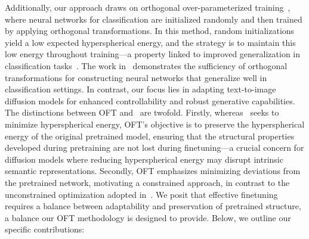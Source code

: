 Additionally, our approach draws on orthogonal over-parameterized training~\cite{liu2021orthogonal}, where neural networks for classification are initialized randomly and then trained by applying orthogonal transformations. In this method, random initializations yield a low expected hyperspherical energy, and the strategy is to maintain this low energy throughout training—a property linked to improved generalization in classification tasks~\cite{liu2018learning,lin2020regularizing}. The work in~\cite{liu2021orthogonal} demonstrates the sufficiency of orthogonal transformations for constructing neural networks that generalize well in classification settings. In contrast, our focus lies in adapting text-to-image diffusion models for enhanced controllability and robust generative capabilities. The distinctions between OFT and~\cite{liu2021orthogonal} are twofold. Firstly, whereas~\cite{liu2021orthogonal} seeks to minimize hyperspherical energy, OFT’s objective is to preserve the hyperspherical energy of the original pretrained model, ensuring that the structural properties developed during pretraining are not lost during finetuning—a crucial concern for diffusion models where reducing hyperspherical energy may disrupt intrinsic semantic representations. Secondly, OFT emphasizes minimizing deviations from the pretrained network, motivating a constrained approach, in contrast to the unconstrained optimization adopted in~\cite{liu2021orthogonal}. We posit that effective finetuning requires a balance between adaptability and preservation of pretrained structure, a balance our OFT methodology is designed to provide. Below, we outline our specific contributions:

